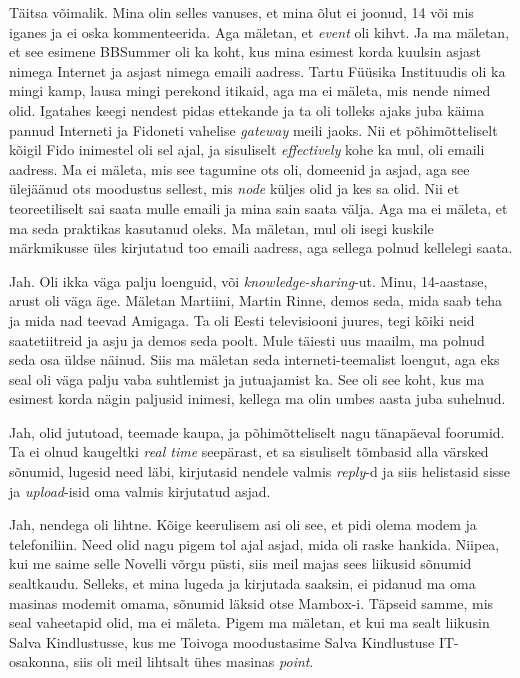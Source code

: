 Täitsa võimalik. Mina olin selles vanuses, et  mina õlut ei  joonud, 14 või mis iganes ja ei oska kommenteerida. Aga mäletan, et \emph{event} oli kihvt. Ja ma mäletan, et see esimene BBSummer oli ka koht, kus mina esimest korda kuulsin asjast nimega Internet ja asjast nimega emaili aadress. Tartu Füüsika Instituudis oli ka mingi kamp, lausa mingi perekond itikaid, aga ma ei mäleta, mis nende nimed olid. Igatahes keegi nendest pidas ettekande ja ta oli tolleks ajaks juba käima pannud Interneti ja Fidoneti vahelise \emph{gateway} meili jaoks. Nii et põhimõtteliselt kõigil Fido inimestel oli sel ajal, ja sisuliselt \emph{effectively} kohe ka mul, oli  emaili aadress. Ma ei mäleta, mis see tagumine ots oli, domeenid ja asjad, aga see ülejäänud ots moodustus sellest, mis \emph{node} küljes olid ja kes sa olid. Nii et teoreetiliselt sai saata mulle emaili ja mina sain saata välja. Aga ma ei mäleta, et ma seda praktikas kasutanud oleks. Ma mäletan, mul oli isegi kuskile märkmikusse üles kirjutatud too emaili aadress, aga sellega polnud kellelegi saata. 


Jah. Oli ikka väga palju loenguid, või \emph{knowledge-sharing}-ut. Minu, 14-aastase, arust oli väga äge. Mäletan Martiini, Martin Rinne, demos seda, mida saab teha ja mida nad teevad Amigaga. Ta oli Eesti televisiooni juures, tegi kõiki neid saatetiitreid ja asju ja demos seda poolt. Mule  täiesti uus maailm, ma polnud seda osa üldse näinud. Siis ma mäletan seda interneti-teemalist loengut, aga eks seal oli väga palju vaba suhtlemist ja jutuajamist ka. See oli see koht, kus ma esimest korda nägin paljusid inimesi, kellega ma olin umbes aasta juba suhelnud. 


Jah, olid jututoad, teemade kaupa, ja põhimõtteliselt nagu tänapäeval foorumid. Ta ei olnud kaugeltki \emph{real time} seepärast, et sa sisuliselt tõmbasid alla värsked sõnumid, lugesid need läbi, kirjutasid nendele valmis \emph{reply}-d ja siis  helistasid sisse ja \emph{upload}-isid oma valmis kirjutatud asjad. 


Jah, nendega oli lihtne. Kõige keerulisem asi oli see, et pidi olema modem ja telefoniliin. Need olid nagu pigem tol ajal asjad, mida oli raske hankida. Niipea, kui me saime selle Novelli võrgu püsti, siis meil majas sees liikusid sõnumid sealtkaudu. Selleks, et mina lugeda ja kirjutada saaksin, ei pidanud ma oma masinas modemit omama, sõnumid läksid otse Mambox-i. Täpseid samme, mis seal vaheetapid olid, ma ei mäleta. Pigem ma mäletan, et kui ma sealt liikusin Salva Kindlustusse, kus me Toivoga moodustasime Salva Kindlustuse IT-osakonna, siis oli meil lihtsalt ühes masinas \emph{point}. 

